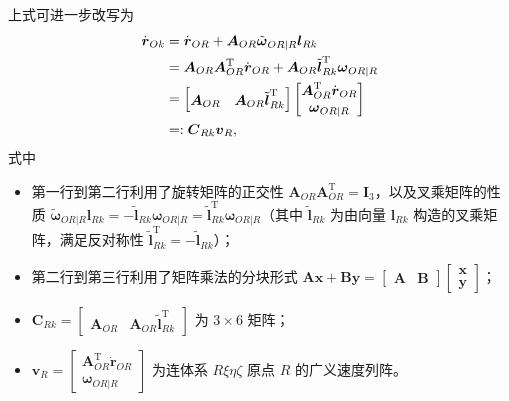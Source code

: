 上式可进一步改写为
\begin{align*}\dot{\boldsymbol{r}}_{Ok} &= \dot{\boldsymbol{r}}_{OR} + \boldsymbol{A}_{OR} \tilde{\boldsymbol{\omega}}_{OR|R} \boldsymbol{l}_{Rk} \notag \\
&= \boldsymbol{A}_{OR} \boldsymbol{A}_{OR}^{\mathrm{T}} \dot{\boldsymbol{r}}_{OR} + \boldsymbol{A}_{OR} \tilde{\boldsymbol{l}}_{Rk}^{\mathrm{T}} \boldsymbol{\omega}_{OR|R} \notag \\
&= \begin{bmatrix} \boldsymbol{A}_{OR} & \boldsymbol{A}_{OR} \tilde{\boldsymbol{l}}_{Rk}^{\mathrm{T}} \end{bmatrix} \begin{bmatrix} \boldsymbol{A}_{OR}^{\mathrm{T}} \dot{\boldsymbol{r}}_{OR} \\ \boldsymbol{\omega}_{OR|R} \end{bmatrix} \notag \\
&=: \boldsymbol{C}_{Rk} \boldsymbol{v}_R,\end{align*}
式中
\begin{itemize}

\item 第一行到第二行利用了旋转矩阵的正交性 $\boldsymbol{A}_{OR} \boldsymbol{A}_{OR}^{\mathrm{T}} = \boldsymbol{I}_3$，以及叉乘矩阵的性质 $\tilde{\boldsymbol{\omega}}_{OR|R} \boldsymbol{l}_{Rk} = -\tilde{\boldsymbol{l}}_{Rk} \boldsymbol{\omega}_{OR|R} = \tilde{\boldsymbol{l}}_{Rk}^{\mathrm{T}} \boldsymbol{\omega}_{OR|R}$（其中 $\tilde{\boldsymbol{l}}_{Rk}$ 为由向量 $\boldsymbol{l}_{Rk}$ 构造的叉乘矩阵，满足反对称性 $\tilde{\boldsymbol{l}}_{Rk}^{\mathrm{T}} = -\tilde{\boldsymbol{l}}_{Rk}$）；

\item 第二行到第三行利用了矩阵乘法的分块形式 $\boldsymbol{A}\boldsymbol{x} + \boldsymbol{B}\boldsymbol{y} = \begin{bmatrix} \boldsymbol{A} & \boldsymbol{B} \end{bmatrix} \begin{bmatrix} \boldsymbol{x} \\ \boldsymbol{y} \end{bmatrix}$；

\item $\boldsymbol{C}_{Rk} = \begin{bmatrix} \boldsymbol{A}_{OR} & \boldsymbol{A}_{OR} \tilde{\boldsymbol{l}}_{Rk}^{\mathrm{T}} \end{bmatrix}$ 为 $3 \times 6$ 矩阵；

\item $\boldsymbol{v}_R = \begin{bmatrix} \boldsymbol{A}_{OR}^{\mathrm{T}} \dot{\boldsymbol{r}}_{OR} \\ \boldsymbol{\omega}_{OR|R} \end{bmatrix}$ 为连体系 $R\xi\eta\zeta$ 原点 $R$ 的广义速度列阵。

\end{itemize}
